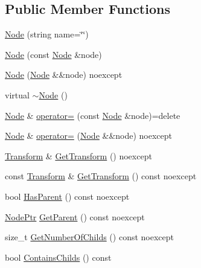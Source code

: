 \subsection*{Public Member Functions}
\begin{DoxyCompactItemize}
\item 
\mbox{\hyperlink{classmage_1_1_node_a6638b75608b2b340743a0a639230492d}{Node}} (string name=\char`\"{}\char`\"{})
\item 
\mbox{\hyperlink{classmage_1_1_node_af9da591163469f210895f3a5b389d7cc}{Node}} (const \mbox{\hyperlink{classmage_1_1_node}{Node}} \&node)
\item 
\mbox{\hyperlink{classmage_1_1_node_a848ecb05c6b085cb4f27e38add85e64c}{Node}} (\mbox{\hyperlink{classmage_1_1_node}{Node}} \&\&node) noexcept
\item 
virtual \mbox{\hyperlink{classmage_1_1_node_a1369fc11b331abacbaf11aeb5729e871}{$\sim$\+Node}} ()
\item 
\mbox{\hyperlink{classmage_1_1_node}{Node}} \& \mbox{\hyperlink{classmage_1_1_node_ad10ea13608963acfa06d3c1577314da5}{operator=}} (const \mbox{\hyperlink{classmage_1_1_node}{Node}} \&node)=delete
\item 
\mbox{\hyperlink{classmage_1_1_node}{Node}} \& \mbox{\hyperlink{classmage_1_1_node_a10d0ed7f0ade94ce7cbd6f413ae82757}{operator=}} (\mbox{\hyperlink{classmage_1_1_node}{Node}} \&\&node) noexcept
\item 
\mbox{\hyperlink{classmage_1_1_transform}{Transform}} \& \mbox{\hyperlink{classmage_1_1_node_ad087f43f468552c7d4e2a4ea605b0220}{Get\+Transform}} () noexcept
\item 
const \mbox{\hyperlink{classmage_1_1_transform}{Transform}} \& \mbox{\hyperlink{classmage_1_1_node_aa8e2a3e9361dbdb4be23a8986f4ef082}{Get\+Transform}} () const noexcept
\item 
bool \mbox{\hyperlink{classmage_1_1_node_a2c1fe63ec1cb15321f0b0f5879227dcd}{Has\+Parent}} () const noexcept
\item 
\mbox{\hyperlink{classmage_1_1_node_ac575dc006e0ae1134277ade977dc06b6}{Node\+Ptr}} \mbox{\hyperlink{classmage_1_1_node_add9389d951ae864d7f92261398297089}{Get\+Parent}} () const noexcept
\item 
size\+\_\+t \mbox{\hyperlink{classmage_1_1_node_a975d92d3d93fe00d748c341198ddf02c}{Get\+Number\+Of\+Childs}} () const noexcept
\item 
bool \mbox{\hyperlink{classmage_1_1_node_afd885043a9de1b0c09d1eb0ef7bf6006}{Contains\+Childs}} () const
\item 

\end{DoxyCompactItemize}
